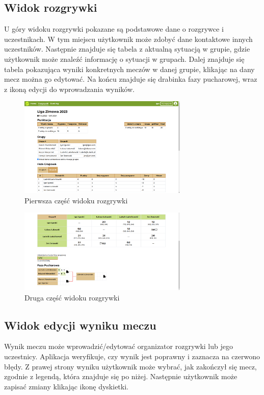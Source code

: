 \documentclass[shortabstract]{iithesis}
\begin{document}
\newpage
\subsection{Widok rozgrywki}
U góry widoku rozgrywki pokazane są podstawowe dane o rozgrywce i uczestnikach.
W tym miejscu użytkownik może zdobyć dane kontaktowe innych uczestników.
Następnie znajduje się tabela z aktualną sytuacją w grupie, gdzie użytkownik może znaleźć informację o sytuacji w grupach.
Dalej znajduje się tabela pokazująca wyniki konkretnych meczów w danej grupie, klikając na dany mecz można go edytować.
Na końcu znajduje się drabinka fazy pucharowej, wraz z ikoną edycji do wprowadzania wyników.
\begin{figure}[H]
    \centering
    \includegraphics[width=0.72\textwidth,valign=t]{assets/interfejs/rozgrywka_desktop.png}
    \caption{Pierwsza część widoku rozgrywki}
\end{figure}
\begin{figure}[H]
    \centering
    \includegraphics[width=0.72\textwidth,valign=t]{assets/interfejs/rozgrywka_desktop2.png}
    \caption{Druga część widoku rozgrywki}
\end{figure}

\subsection{Widok edycji wyniku meczu}
Wynik meczu może wprowadzić\slash edytować organizator rozgrywki lub jego uczestnicy.
Aplikacja weryfikuje, czy wynik jest poprawny i zaznacza na czerwono błędy. Z prawej strony wyniku
użytkownik może wybrać, jak zakończył się mecz, zgodnie z legendą, która znajduje się po niżej.
Następnie użytkownik może zapisać zmiany klikając ikonę dyskietki.
\end{document}
